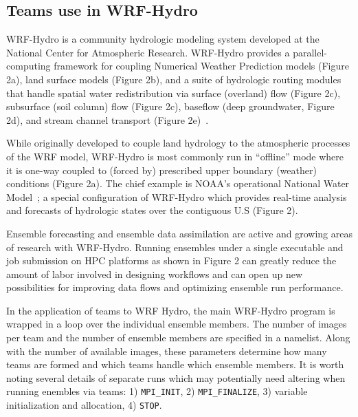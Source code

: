 \subsection{Teams use in WRF-Hydro}

WRF-Hydro is a community hydrologic modeling system developed at the
National Center for Atmospheric Research.  WRF-Hydro provides a
parallel-computing framework for coupling Numerical Weather Prediction
models (Figure 2a), land surface models (Figure 2b), and a suite of hydrologic routing modules that handle
spatial water redistribution via surface (overland) flow (Figure 2c),
subsurface (soil column) flow (Figure 2c), baseflow (deep groundwater,
Figure 2d), and stream
channel transport (Figure 2e)~\cite{gochisEtal}.

While originally developed to couple land hydrology to the atmospheric processes of
the WRF model, WRF-Hydro is most commonly run in ``offline'' mode where it is one-way
coupled to (forced by) prescribed upper boundary (weather)
conditions (Figure 2a). The chief example is NOAA's operational
National Water Model~\cite{noaa2016}; a special configuration of
WRF-Hydro which provides real-time analysis and forecasts of
hydrologic states over the contiguous U.S (Figure 2).

Ensemble forecasting and ensemble data assimilation are active and
growing areas of research with WRF-Hydro. Running ensembles under a
single executable and job submission on HPC platforms as shown in
Figure 2 can greatly reduce the amount
of labor involved in designing workflows and can open up new
possibilities for improving data flows and optimizing ensemble run
performance.

In the application of teams to WRF Hydro, the main WRF-Hydro program is wrapped in a loop
over the individual ensemble members. The number of images per team and the
 number of ensemble members are specified in a namelist. Along with
 the number of available images, these parameters determine how many
 teams are formed and which teams handle which ensemble members. It is
 worth noting several details of separate runs which may potentially need altering
 when running enembles via teams: 1) \texttt{MPI\_INIT}, 2) \texttt{MPI\_FINALIZE}, 3)
 variable initialization and allocation, 4) \texttt{STOP}.   

